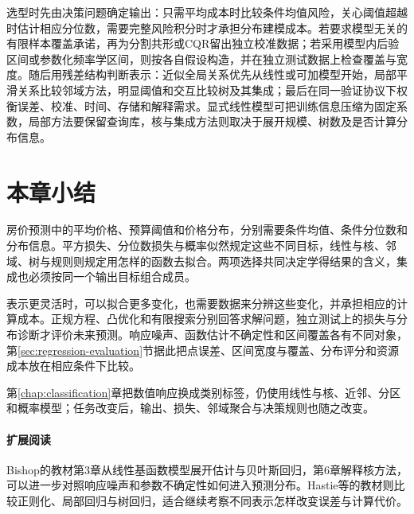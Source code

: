 选型时先由决策问题确定输出：只需平均成本时比较条件均值风险，关心阈值超越时估计相应分位数，需要完整风险积分时才承担分布建模成本。若要求模型无关的有限样本覆盖承诺，再为分割共形或CQR留出独立校准数据；若采用模型内后验区间或参数化频率学区间，则按各自假设构造，并在独立测试数据上检查覆盖与宽度。随后用残差结构判断表示：近似全局关系优先从线性或可加模型开始，局部平滑关系比较邻域方法，明显阈值和交互比较树及其集成；最后在同一验证协议下权衡误差、校准、时间、存储和解释需求。显式线性模型可把训练信息压缩为固定系数，局部方法要保留查询库，核与集成方法则取决于展开规模、树数及是否计算分布信息。

\section{本章小结}
\label{sec:regression-summary}

房价预测中的平均价格、预算阈值和价格分布，分别需要条件均值、条件分位数和分布信息。平方损失、分位数损失与概率似然规定这些不同目标，线性与核、邻域、树与规则则规定用怎样的函数去拟合。两项选择共同决定学得结果的含义，集成也必须按同一个输出目标组合成员。

表示更灵活时，可以拟合更多变化，也需要数据来分辨这些变化，并承担相应的计算成本。正规方程、凸优化和有限搜索分别回答求解问题，独立测试上的损失与分布诊断才评价未来预测。响应噪声、函数估计不确定性和区间覆盖各有不同对象，第\ref{sec:regression-evaluation}节据此把点误差、区间宽度与覆盖、分布评分和资源成本放在相应条件下比较。

第\ref{chap:classification}章把数值响应换成类别标签，仍使用线性与核、近邻、分区和概率模型；任务改变后，输出、损失、邻域聚合与决策规则也随之改变。

\paragraph{扩展阅读}
Bishop的教材第3章从线性基函数模型展开估计与贝叶斯回归，第6章解释核方法，可以进一步对照响应噪声和参数不确定性如何进入预测分布。Hastie等的教材则比较正则化、局部回归与树回归，适合继续考察不同表示怎样改变误差与计算代价。